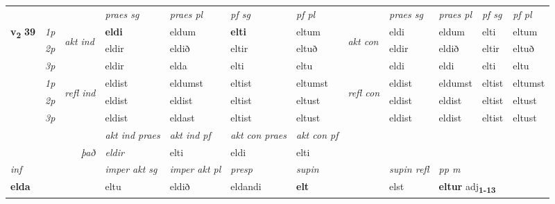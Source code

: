 \begin{longtable}[l]{X>{\footnotesize\itshape}llXXXXlXXXX}
 & &   & \textit{praes sg}  & \textit{praes pl}    & \textit{ pf sg} & \textit{pf pl} & & \textit{praes sg}  & \textit{praes pl}    & \textit{pf sg} & \textit{pf pl }  \\ \cmidrule{4-7} \cmidrule{9-12}
 \multirow{2}{*}{{{\textbf{v{\textsubscript{2}}} \Large{\textbf{39}}}}}  & 1p & \multirow{3}{*}{\begin{turn}{90}\textit{akt ind}\end{turn}} & \textbf{eldi} & eldum & \textbf{elti} & eltum & \multirow{3}{*}{\begin{turn}{90}\textit{akt con}\end{turn}} &eldi & eldum & elti & eltum\\*
 & 2p &  &  eldir  & eldið & eltir & eltuð & & eldir & eldið & eltir & eltuð \\*
 & 3p &  & eldir & elda & elti & eltu & & eldi & eldi& elti & eltu \\*
\cmidrule{4-7} \cmidrule{9-12}
 & 1p & \multirow{3}{*}{\begin{turn}{90}\textit{refl ind}\end{turn}}  & eldist & eldumst & eltist & eltumst & \multirow{3}{*}{\begin{turn}{90}\textit{refl con}\end{turn}}  &eldist & eldumst & eltist & eltumst \\*
 & 2p &  & eldist & eldist & eltist & eltust & &eldist & eldist & eltist & eltust \\*
 & 3p  & & eldist & eldast & eltist & eltust & & eldist & eldist& eltist & eltust \\*
\cmidrule{4-7} \cmidrule{9-12}

   && &  \textit{akt ind praes} & \textit{akt ind pf} & \textit{akt con praes} & \textit{akt con pf} \\*
\multicolumn{3}{r}{\textit{það}} & eldir & elti & eldi & elti \\*

\cmidrule{4-7}
   {\textit{inf}} & &  & \textit{imper akt sg} & \textit{imper akt pl}   & \textit{presp} & \textit{supin} && \textit{supin refl} & \textit{pp m} \\*
  {\textbf{elda}} & && eltu  & eldið   & eldandi &  \textbf{elt} && elst & \multicolumn{2}{l}{\textbf{eltur} adj\textbf{\textsubscript{1-13}}} \\*

\midrule


\end{longtable}

